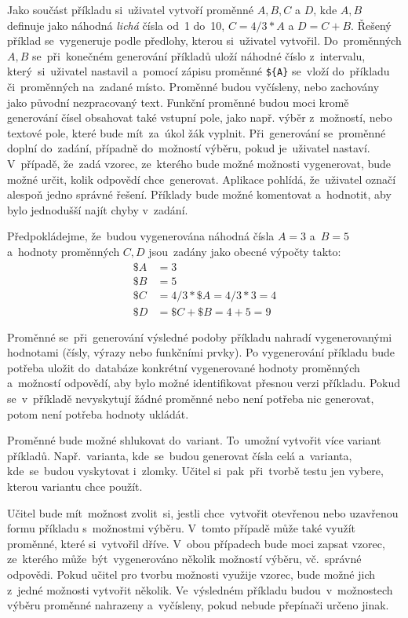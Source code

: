 \documentclass[11pt,a4paper]{report}
\begin{document}
            Jako součást příkladu si~uživatel vytvoří proměnné $A, B, C$ a $D$, kde $A, B$ definuje jako náhodná \emph{lichá} čísla od~1 do~10, $C = 4/3*A$ a $D = C + B$. Řešený příklad se~vygeneruje podle předlohy, kterou si~uživatel vytvořil. Do~proměnných $A, B$ se~při~konečném generování příkladů uloží náhodné číslo z~intervalu, který~si~uživatel nastavil a~pomocí zápisu proměnné \texttt{\$\{A\}} se~vloží do~příkladu či~proměnných na~zadané místo. Proměnné budou vyčísleny, nebo zachovány jako původní nezpracovaný text. Funkční proměnné budou moci kromě generování čísel obsahovat také vstupní pole, jako např. výběr z~možností, nebo textové pole, které bude mít~za~úkol žák vyplnit. Při~generování se~proměnné doplní do~zadání, případně do~možností výběru, pokud je~uživatel nastaví. V~případě, že~zadá vzorec, ze~kterého bude možné možnosti vygenerovat, bude možné určit, kolik odpovědí chce~generovat. Aplikace pohlídá, že~uživatel označí alespoň jedno správné řešení. Příklady bude možné komentovat a~hodnotit, aby bylo jednodušší najít chyby v~zadání.
            
            Předpokládejme, že~budou vygenerována náhodná čísla $A = 3$ a~$B = 5$ a~hodnoty proměnných $C, D$ jsou~zadány jako obecné výpočty takto:
            \begin{align*}
                \$A &= 3 \\
                \$B &= 5 \\
                \$C &= 4/3*\$A = 4/3*3 = 4 \\
                \$D &= \$C + \$B = 4 + 5 = 9
            \end{align*}

            Proměnné se~při~generování výsledné podoby příkladu nahradí vygenerovanými hodnotami (čísly, výrazy nebo funkčními prvky). Po vygenerování příkladu bude potřeba uložit do~databáze konkrétní vygenerované hodnoty proměnných a~možností odpovědí, aby bylo možné identifikovat přesnou verzi příkladu. Pokud se~v~příkladě nevyskytují žádné proměnné nebo není potřeba nic generovat, potom není potřeba hodnoty ukládát.

            Proměnné bude možné shlukovat do~variant. To~umožní vytvořit více variant příkladů. Např.~varianta, kde~se~budou generovat čísla celá a~varianta, kde~se~budou vyskytovat i~zlomky. Učitel si~pak~při~tvorbě testu jen vybere, kterou variantu chce použít.

            Učitel bude mít~možnost zvolit~si, jestli chce~vytvořit otevřenou nebo uzavřenou formu příkladu s~možnostmi výběru. V~tomto případě může také využít proměnné, které si~vytvořil dříve. V~obou případech bude moci zapsat vzorec, ze~kterého může~být~vygenerováno několik možností výběru, vč.~správné odpovědi. Pokud učitel pro tvorbu možnosti využije vzorec, bude možné jich z~jedné možnosti vytvořit několik. Ve~výsledném příkladu budou~v~možnostech výběru proměnné nahrazeny a~vyčísleny, pokud nebude přepínači určeno jinak.
\end{document}
